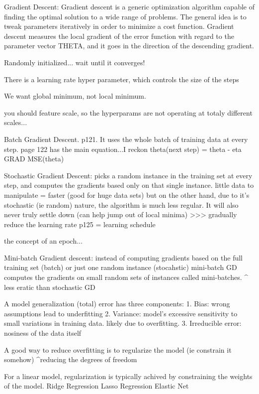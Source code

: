 Gradient Descent:
Gradient descent is a generic optimization algorithm capable of finding the optimal solution to a wide range of problems. 
The general idea is to tweak parameters iteratively in order to minimize a cost function.
Gradient descent measures the local gradient of the error function with regard to the parameter vector THETA,
and it goes in the direction of the descending gradient.

Randomly initialized... wait until it converges!

There is a learning rate hyper parameter, which controls the size of the steps

We want global minimum, not local minimum.

you should feature scale, so the hyperparams are not operating at totaly different scales...

Batch Gradient Descent. p121.
It uses the whole batch of training data at every step.
page 122 has the main equation...I reckon
theta(next step) = theta - eta GRAD MSE(theta)

Stochastic Gradient Descent:
picks a random instance in the training set at every step,
and computes the gradients based only on that single instance.
little data to manipulate = faster (good for huge data sets)
but on the other hand,
due to it's stochastic (ie random) nature,
the algorithm is much less regular.
It will also never truly settle down (can help jump out of local minima)
>>> gradually reduce the learning rate p125 = learning schedule

the concept of an epoch...

Mini-batch Gradient descent:
instead of computing gradients based on the full training set (batch)
or just one random instance (stocahstic)
mini-batch GD computes the gradients on small random sets of instances called mini-batches.
^ less eratic than stochastic GD

A model generalization (total) error has three components:
1. Bias: wrong assumptions lead to underfitting
2. Variance: model's excessive sensitivity to small variations in training data. likely due to overfitting.
3. Irreducible error: nosiness of the data itself


A good way to reduce overfitting is to regularize the model (ie constrain it somehow)
^reducing the degrees of freedom

For a linear model, regularization is typically achived by constraining the weights of the model.
Ridge Regression
Lasso Regression
Elastic Net

